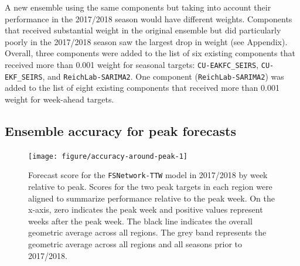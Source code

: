 \documentclass{article}\usepackage[]{graphicx}\usepackage[]{color}
\newenvironment{knitrout}{}{} %
\begin{document}




A new ensemble using the same components but taking into account their performance in the 2017/2018 season would have different weights.
Components that received substantial weight in the original ensemble but did particularly poorly in the 2017/2018 season saw the largest drop in weight (see Appendix). 
Overall, three components were added to the list of six existing components that received more than 0.001 weight for seasonal targets: {\tt CU-EAKFC\_SEIRS}, {\tt CU-EKF\_SEIRS}, and {\tt ReichLab-SARIMA2}.
One component ({\tt ReichLab-SARIMA2}) was added to the list of eight existing components that received more than 0.001 weight for week-ahead targets.


\subsection{Ensemble accuracy for peak forecasts}

\begin{knitrout}
\color{fgcolor}\begin{figure}
\texttt{[image: figure/accuracy-around-peak-1]} \caption[Forecast score for the {\tt FSNetwork-TTW} model in 2017/2018 by week relative to peak]{Forecast score for the {\tt FSNetwork-TTW} model in 2017/2018 by week relative to peak. Scores for the two peak targets in each region were aligned to summarize performance relative to the peak week. On the x-axis, zero indicates the peak week and positive values represent weeks after the peak week. The black line indicates the overall geometric average across all regions. The grey band represents the geometric average across all regions and all seasons prior to 2017/2018.}\label{fig:accuracy-around-peak}
\end{figure}


\end{knitrout}
\end{document}
